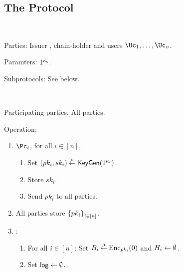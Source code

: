 \subsection{The Protocol}\label{sec:MainProtocol:Protocol}


\begin{protocol}~\label{prot:ConfidentialTransactions}

\item[Parties:] Issuer \Ic, chain-holder \Cc and users  $\Uc_1, \ldots,\Uc_n$.

\item[Paramters:]	$1^{\kappa_{\mathsf c}}$.

\item[Subprotocols:]  See below.
\end{protocol}


\begin{protocol}~\label{prot:ConfidentialTransactions:Init}
	\item[Participating parties.] All parties.
			
			\item Operation:
			
			
			\begin{enumerate}
				
				\item   $\Pc_i$, for  all $i\in [n]$,
				\begin{enumerate}
					\item Set $(pk_i,sk_i) \mathbin{\stackrel{\mbox{\tiny R}}{\leftarrow}} \mathsf{KeyGen}(1^{\kappa_{\mathsf c}})$.
					
					\item Store $sk_i$.
					
					\item Send $pk_i$ to all parties.
				\end{enumerate}
				
				\item All parties  store $\set{pk_i}_{i\in [n]}$.
				
				\item \Cc: 
				\begin{enumerate}
					\item 	For  all $i\in [n]$: Set $B_i\mathbin{\stackrel{\mbox{\tiny R}}{\leftarrow}} \operatorname{Enc}_{pk_i}(0)$ and $H_i\leftarrow \emptyset$.
					
					\item    Set $\mathsf{log} \leftarrow \emptyset$.
				\end{enumerate}								
			\end{enumerate}
\end{protocol}


